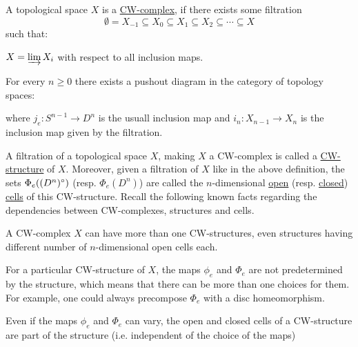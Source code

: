\begin{definition} A topological space $X$ is a \ul{CW-complex}, if there exists some filtration
$$\emptyset=X_{-1}\subseteq X_0\subseteq X_1\subseteq X_2\subseteq\cdots\subseteq X$$
such that:
\begin{b_item}
\item $X=\varinjlim X_i$ with respect to all inclusion maps.
\item For every $n\geq0$ there exists a pushout diagram in the category of topology spaces:
\begin{center}
\end{center}
where $j_e:S^{n-1}\to D^n$ is the usuall inclusion map and $i_n:X_{n-1}\to X_n$ is the inclusion map given by the filtration.
\end{b_item}
\end{definition}

A filtration of a topological space $X$, making $X$ a CW-complex is called a \ul{CW-structure} of $X$. Moreover, given a filtration of $X$ like in the above definition, the sets $\Phi_e\large((D^n)^{\circ}\large)$ (resp. $\Phi_e(D^n)$) are called the $n$-dimensional \ul{open} (resp. \ul{closed}) \ul{cells} of this CW-structure. Recall the following known facts regarding the dependencies between CW-complexes, structures and cells.

\begin{notes}
\begin{i_enum}
\item A CW-complex $X$ can have more than one CW-structures, even structures having different number of $n$-dimensional open cells each.
\item For a particular CW-structure of $X$, the maps $\phi_e$ and $\Phi_e$ are not predetermined by the structure, which means that there can be more than one choices for them. For example, one could always precompose $\Phi_e$ with a disc homeomorphism.
\item Even if the maps $\phi_e$ and $\Phi_e$ can vary, the open and closed cells of a CW-structure are part of the structure (i.e. independent of the choice of the maps)
\end{i_enum}
\end{notes}






